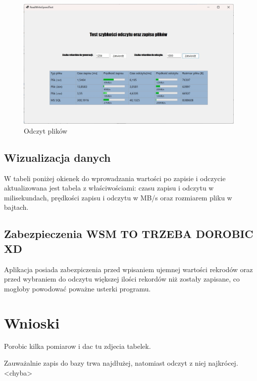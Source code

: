 \documentclass{report}
\begin{document}
\begin{figure}[h]
\centering
\includegraphics[width=15cm]{img/odczyt.jpg}
\caption{Odczyt plików}
\end{figure}

\subsection{Wizualizacja danych}
W tabeli poniżej okienek do wprowadzania wartości po zapisie i odczycie aktualizowana jest tabela z właściwościami: czasu zapisu i odczytu w milisekundach, prędkości zapisu i odczytu w MB/s oraz rozmiarem pliku w bajtach.
\subsection{Zabezpieczenia WSM TO TRZEBA DOROBIC XD}
Aplikacja posiada zabezpiczenia przed wpisaniem ujemnej wartości rekrodów oraz przed wybraniem do odczytu większej ilości rekordów niż zostały zapisane, co mogłoby powodować poważne usterki programu.

\section{Wnioski}
Porobic kilka pomiarow i dac tu zdjecia tabelek.

Zauważalnie zapis do bazy trwa najdłużej, natomiast odczyt z niej najkrócej. <chyba>
\end{document}
